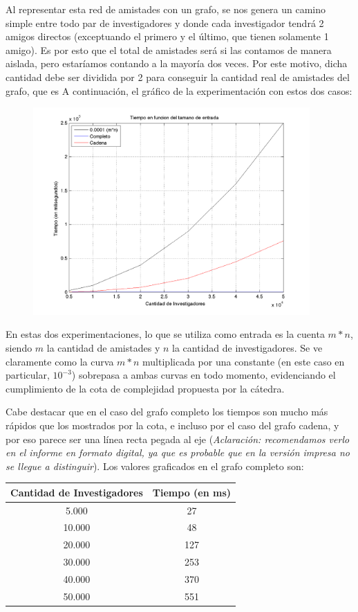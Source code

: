 Al representar esta red de amistades con un grafo, se nos genera un camino simple entre todo par de investigadores y donde cada investigador tendrá 2 amigos directos (exceptuando el primero y el último, que tienen solamente 1 amigo). Es por esto que el total de amistades será 
si las contamos de manera aislada, pero estaríamos contando a la mayoría dos veces. Por este motivo, dicha cantidad debe ser dividida por 2 para conseguir la cantidad real de amistades del grafo, que es 
A continuación, el gráfico de la experimentación con estos dos casos:
\begin{figure}[h]
	\centering
	\includegraphics[width=400px]{./figs/cotaComparacion.png}
\end{figure}

En estas dos experimentaciones, lo que se utiliza como entrada es la cuenta $m*n$, siendo $m$ la cantidad de amistades y $n$ la cantidad de investigadores. Se ve claramente como la curva $m*n$ multiplicada por una constante (en este caso en particular, $10^{-3}$) sobrepasa a ambas curvas en todo momento, evidenciando el cumplimiento de la cota de complejidad propuesta por la cátedra.

Cabe destacar que en el caso del grafo completo los tiempos son mucho más rápidos que los mostrados por la cota, e incluso por el caso del grafo cadena, y por eso parece ser una línea recta pegada al eje (\textit{Aclaración: recomendamos verlo en el informe en formato digital, ya que es probable que en la versión impresa no se llegue a distinguir}). Los valores graficados en el grafo completo son:

\begin{center}
\begin{tabular}{|c|c|}\hline
	\textbf{Cantidad de Investigadores}	&	\textbf{Tiempo (en ms)}	\\ \hline
	5.000	&	27	\\ \hline
	10.000	&	48	\\ \hline
	20.000	&	127	\\ \hline
	30.000	&	253	\\ \hline
	40.000	&	370	\\ \hline
	50.000	&	551	\\ \hline
\end{tabular}
\end{center}

